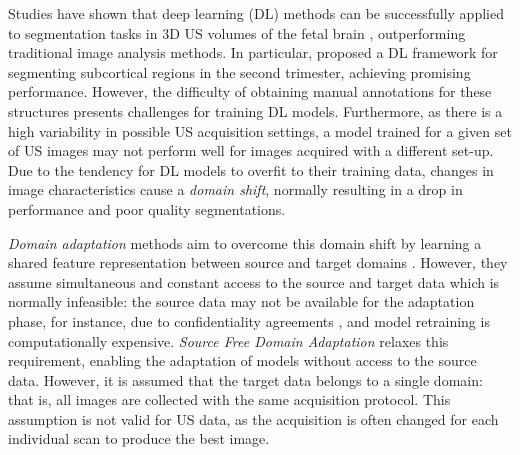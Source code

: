 \documentclass[conference]{IEEEtran}
\begin{document}
Studies have shown that deep learning (DL) methods can be successfully applied to segmentation tasks in 3D US volumes of the fetal brain \cite{Hesse2022,Wyburd2020cortical}, outperforming traditional image analysis methods. In particular, \cite{Hesse2022} proposed a DL framework for segmenting subcortical regions in the second trimester, achieving promising performance. However, the difficulty of obtaining manual annotations for these structures presents challenges for training DL models. Furthermore, as there is a high variability in possible US acquisition settings, a model trained for a given set of US images may not perform well for images acquired with a different set-up. 
Due to the tendency for DL models to overfit to their training data, changes in image characteristics cause a \textit{domain shift}, normally resulting in a drop in performance and poor quality segmentations. 

\textit{Domain adaptation} methods aim to overcome this domain shift by learning a shared feature representation between source and target domains \cite{Ganin2015,Sun2016}. However, they assume simultaneous and constant access to the source and target data which is normally infeasible: the source data may not be available for the adaptation phase, for instance, due to confidentiality agreements \cite{Bateson2022}, and model retraining is computationally expensive. \textit{Source Free Domain Adaptation} \cite{Bateson2022,Liang2020} relaxes this requirement, enabling the adaptation of models without access to the source data. However, it is assumed that the target data belongs to a single domain: that is, all images are collected with the same acquisition protocol. This assumption is not valid for US data, as the acquisition is often changed for each individual scan to produce the best image. 
\end{document}

